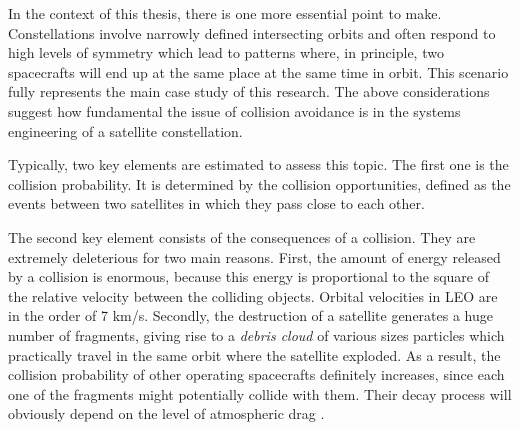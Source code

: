 
In the context of this thesis, there is one more essential point to make.
Constellations involve narrowly defined intersecting orbits and often respond to high levels of symmetry which lead to patterns where, in principle, two spacecrafts will end up at the same place at the same time in orbit. 
This scenario fully represents the main case study of this research.
The above considerations suggest how fundamental the issue of collision avoidance is in the systems engineering of a satellite constellation.

Typically, two key elements are estimated to assess this topic.
The first one is the collision probability.
It is determined by the collision opportunities, defined as the events between two satellites in which they pass close to each other.

The second key element consists of the consequences of a collision.
They are extremely deleterious for two main reasons.
First, the amount of energy released by a collision is enormous, because this energy is proportional to the square of the relative velocity between the colliding objects.
Orbital velocities in LEO are in the order of 7 km/s.
Secondly, the destruction of a satellite generates a huge number of fragments, giving rise to a \textit{debris cloud} of various sizes particles which practically travel in the same orbit where the satellite exploded.
As a result, the collision probability of other operating spacecrafts definitely increases, since each one of the fragments might potentially collide with them.
Their decay process will obviously depend on the level of atmospheric drag \cite{wertz2009orbit}.
